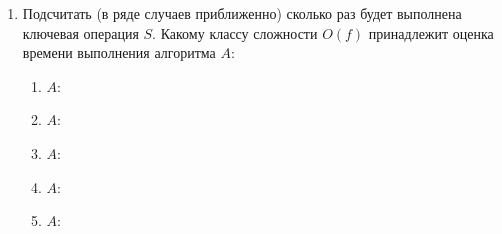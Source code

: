 \begin{enumerate}
    \item Подсчитать (в ряде случаев приближенно) сколько раз будет выполнена ключевая операция $S$. Какому классу сложности $O(f)$ принадлежит оценка времени выполнения алгоритма $A$:
    \begin{enumerate}
        \item $A$:
            \begin{algorithmic}[1]
                \ENDWHILE
            \end{algorithmic}
        \item $A$:
            \begin{algorithmic}[1]
                    \ENDWHILE
                \ENDWHILE
            \end{algorithmic}
        \item $A$:
            \begin{algorithmic}[1]
                    \ENDWHILE
                \ENDWHILE
            \end{algorithmic}
        \item $A$:
            \begin{algorithmic}[1]
                    \ENDWHILE
                \ENDWHILE
            \end{algorithmic}
        \item $A$:
            \begin{algorithmic}[1]
                    \ENDWHILE

\end{algorithmic}
\end{enumerate}
\end{enumerate}

